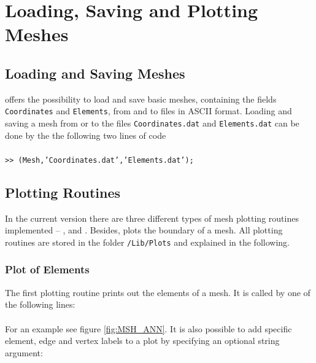 

\section{Loading, Saving and Plotting Meshes}
\label{sect:IO}

\subsection{Loading and Saving Meshes}   \label{ssect:load_save_mesh}

\LIBNAME offers the possibility to load and save basic meshes, containing the fields {\tt Coordinates} and {\tt Elements},
from and to files in ASCII format. Loading and saving a mesh from or to the files {\tt Coordinates.dat} and
{\tt Elements.dat} can be done by the the following two lines of code \\

 \\
{\tt >> (Mesh,'Coordinates.dat','Elements.dat');} \\

\subsection{Plotting Routines}   \label{ssect:plot_mesh}

 In the current version there are three different types of mesh plotting routines implemented -- ,  and . Besides,  plots the boundary of a mesh. All plotting routines are stored in the folder {\tt /Lib/Plots} and explained in the following. 

\subsubsection{Plot of Elements}

 The first plotting routine prints out the elements of a mesh. %
 It is called by one of the following lines: \\

 \\

 For an example see figure \ref{fig:MSH_ANN}. It is also possible to add specific element, edge and vertex labels to a plot by specifying an optional string argument: \\

